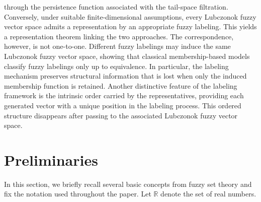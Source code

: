 \documentclass[preprint,12pt]{elsarticle}
\theoremstyle{definition}
\begin{document}
through the persistence function associated with the tail-space filtration. Conversely, under suitable finite-dimensional assumptions, every Lubczonok fuzzy vector space admits a representation by an appropriate fuzzy labeling. This yields a representation theorem linking the two approaches. The correspondence, however, is not one-to-one. Different fuzzy labelings may induce the same Lubczonok fuzzy vector space, showing that classical membership-based models classify fuzzy labelings only up to equivalence. In particular, the labeling mechanism preserves structural information that is lost when only the induced membership function is retained. Another distinctive feature of the labeling framework is the intrinsic order carried by the representatives, providing each generated vector with a unique position in the labeling process. This ordered structure disappears after passing to the associated Lubczonok fuzzy vector space.
\section{Preliminaries}

In this section, we briefly recall several basic concepts from fuzzy set theory and fix the notation used throughout the paper.
Let $\mathbb{R}$ denote the set of real numbers.
\end{document}
